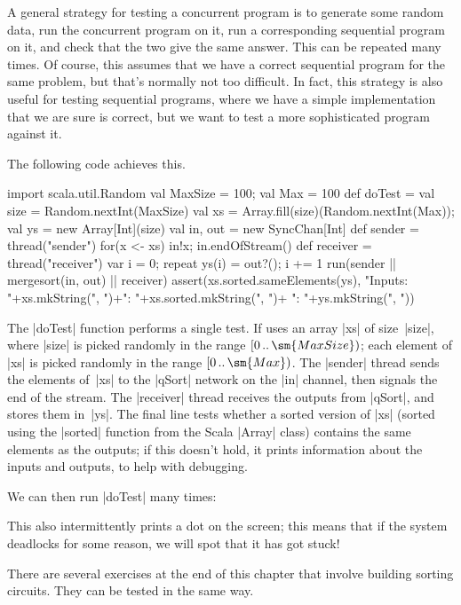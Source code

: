 A general strategy for testing a concurrent program is to generate some random
data, run the concurrent program on it, run a corresponding sequential program
on it, and check that the two give the same answer.  This can be repeated many
times.  Of course, this assumes that we have a correct sequential program for
the same problem, but that's normally not too difficult.  In fact, this
strategy is also useful for testing sequential programs, where we have a
simple implementation that we are sure is correct, but we want to test a more
sophisticated program against it.

The following code achieves this.
%
\begin{scala}
  import scala.util.Random
  val MaxSize = 100; val Max = 100
  def doTest = {
    val size = Random.nextInt(MaxSize)
    val xs = Array.fill(size)(Random.nextInt(Max)); val ys = new Array[Int](size)
    val in, out = new SyncChan[Int]
    def sender = thread("sender"){ for(x <- xs) in!x; in.endOfStream() }
    def receiver = thread("receiver"){ 
      var i = 0; repeat{ ys(i) = out?(); i += 1 } 
    }
    run(sender || mergesort(in, out) || receiver)
    assert(xs.sorted.sameElements(ys),
      "Inputs: "+xs.mkString(", ")+"\nExpected: "+xs.sorted.mkString(", ")+
      "\nReceived: "+ys.mkString(", "))
  }
\end{scala}
%
The |doTest| function performs a single test.  If uses an array |xs| of
size~|size|, where |size| is picked randomly in the range
$\interval{0}{\sm{MaxSize}}$; each element of |xs| is picked randomly in the
range $\interval{0}{\sm{Max}}$.  The |sender| thread sends the elements
of~|xs| to the |qSort| network on the |in| channel, then signals the end of
the stream.  The |receiver| thread receives the outputs from |qSort|, and
stores them in~|ys|.  The final line tests whether a sorted version of |xs|
(sorted using the |sorted| function from the Scala |Array| class) contains the
same elements as the outputs; if this doesn't hold, it prints information
about the inputs and outputs, to help with debugging.

We can then run |doTest| many times:
%
%
This also intermittently prints a dot on the screen; this means that if the
system deadlocks for some reason, we will spot that it has got stuck!

There are several exercises at the end of this chapter that involve building
sorting circuits.  They can be tested in the same way.

